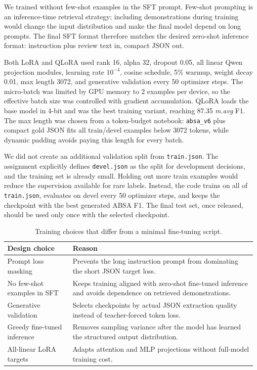 \documentclass[11pt,a4paper]{article}
\newcommand{\mavg}{\textit{m.avg}}
\newcommand{\code}[1]{\texttt{#1}}
\begin{document}
We trained without few-shot examples in the SFT prompt. Few-shot prompting is an inference-time retrieval strategy; including demonstrations during training would change the input distribution and make the final model depend on long prompts. The final SFT format therefore matches the desired zero-shot inference format: instruction plus review text in, compact JSON out.

Both LoRA and QLoRA used rank 16, alpha 32, dropout 0.05, all linear Qwen projection modules, learning rate $10^{-4}$, cosine schedule, 5\% warmup, weight decay 0.01, max length 3072, and generative validation every 50 optimizer steps. The micro-batch was limited by GPU memory to 2 examples per device, so the effective batch size was controlled with gradient accumulation. QLoRA loads the base model in 4-bit and was the best training variant, reaching 87.35 \mavg{} F1. The max length was chosen from a token-budget notebook: \code{absa\_v6} plus compact gold JSON fits all train/devel examples below 3072 tokens, while dynamic padding avoids paying this length for every batch.

We did not create an additional validation split from \code{train.json}. The assignment explicitly defines \code{devel.json} as the split for development decisions, and the training set is already small. Holding out more train examples would reduce the supervision available for rare labels. Instead, the code trains on all of \code{train.json}, evaluates on devel every 50 optimizer steps, and keeps the checkpoint with the best generated ABSA F1. The final test set, once released, should be used only once with the selected checkpoint.

\begin{table}[H]
    \centering
    \small
    \setlength{\tabcolsep}{4pt}
    \caption{Training choices that differ from a minimal fine-tuning script.}
    \label{tab:training_design}
    \begin{tabularx}{\textwidth}{@{}lX@{}}
        \toprule
        Design choice & Reason \\
        \midrule
        Prompt loss masking & Prevents the long instruction prompt from dominating the short JSON target loss. \\
        No few-shot examples in SFT & Keeps training aligned with zero-shot fine-tuned inference and avoids dependence on retrieved demonstrations. \\
        Generative validation & Selects checkpoints by actual JSON extraction quality instead of teacher-forced token loss. \\
        Greedy fine-tuned inference & Removes sampling variance after the model has learned the structured output distribution. \\
        All-linear LoRA targets & Adapts attention and MLP projections without full-model training cost. \\
        \bottomrule
    \end{tabularx}
\end{table}
\end{document}
